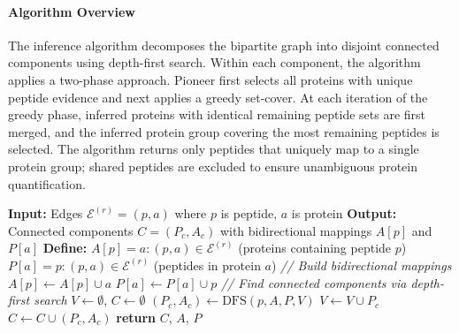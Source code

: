 \documentclass[pdflatex,sn-nature]{sn-jnl}
\begin{document}
\paragraph{Algorithm Overview}\label{para:algorithm-overview} The inference algorithm decomposes the bipartite graph into disjoint connected components using depth-first search. Within each component, the algorithm applies a two-phase approach. Pioneer first selects all proteins with unique peptide evidence and next applies a greedy set-cover. At each iteration of the greedy phase, inferred proteins with identical remaining peptide sets are first merged, and the inferred protein group covering the most remaining peptides is selected. The algorithm returns only peptides that uniquely map to a single protein group; shared peptides are excluded to ensure unambiguous protein quantification.


\begin{algorithm}[H]
\caption{Protein Inference Phase 1: Graph Decomposition}
\begin{algorithmic}[1]
\State \textbf{Input:} Edges $\mathcal{E}^{(r)} = (p, a)$ where $p$ is
peptide, $a$ is protein
\State \textbf{Output:} Connected components $C = (P_c, A_c)$ with
bidirectional mappings $A[p]$ and $P[a]$
\State \textbf{Define:} $A[p] = a : (p, a) \in \mathcal{E}^{(r)}$ (proteins
containing peptide $p$)
\State \hspace{2.3em} $P[a] = p : (p, a) \in \mathcal{E}^{(r)}$ (peptides in
protein $a$)
\State
\State \textit{// Build bidirectional mappings}
  \State $A[p] \gets A[p] \cup a$ 
  \State $P[a] \gets P[a] \cup p$ 
\EndFor
\State
\State \textit{// Find connected components via depth-first search}
\State $V \gets \emptyset$, $C \gets \emptyset$ 
      \State $(P_c, A_c) \gets \text{DFS}(p, A, P, V)$ 
      \State $V \gets V \cup P_c$ 
      \State $C \gets C \cup (P_c, A_c)$
  \EndIf
\EndFor
\State
\State \textbf{return} $C$, $A$, $P$
\end{algorithmic}
\end{algorithm}

\newpage
\end{document}
